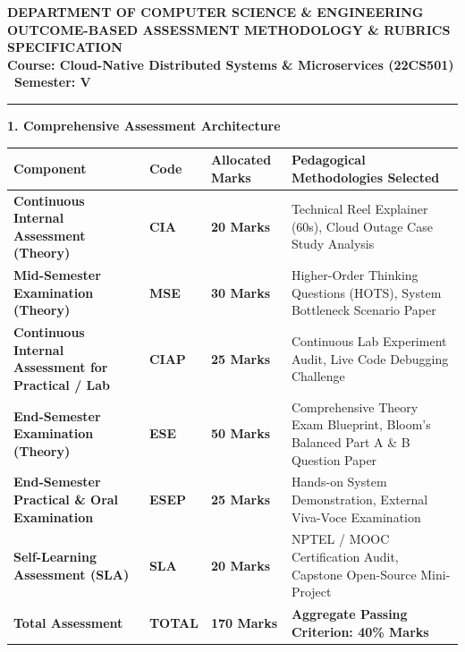 \documentclass[10pt,a4paper]{article}
\begin{document}
\begin{center}
    {\large\textbf{\color{nbaNavy}DEPARTMENT OF COMPUTER SCIENCE \& ENGINEERING}}\\[2pt]
    {\normalsize\textbf{\color{nbaSlate}OUTCOME-BASED ASSESSMENT METHODOLOGY \& RUBRICS SPECIFICATION}}\\[2pt]
    {\footnotesize\textbf{Course: Cloud-Native Distributed Systems \& Microservices (22CS501) \textbullet\ Semester: V}}\\[4pt]
    \rule{\linewidth}{1.2pt}
\end{center}

\vspace{-4pt}

{\large\textbf{\color{nbaNavy}1. Comprehensive Assessment Architecture}}

\begin{table}[h!]
\centering
\small
{}
\begin{tabularx}{\textwidth}{L{2.5cm} C{1.8cm} C{2.2cm} Y}
\toprule
\textbf{Component} & \textbf{Code} & \textbf{Allocated Marks} & \textbf{Pedagogical Methodologies Selected} \\
\midrule
\textbf{Continuous Internal Assessment (Theory)} & \textbf{CIA} & \textbf{20 Marks} & Technical Reel Explainer (60s), Cloud Outage Case Study Analysis \\
\textbf{Mid-Semester Examination (Theory)} & \textbf{MSE} & \textbf{30 Marks} & Higher-Order Thinking Questions (HOTS), System Bottleneck Scenario Paper \\
\textbf{Continuous Internal Assessment for Practical / Lab} & \textbf{CIAP} & \textbf{25 Marks} & Continuous Lab Experiment Audit, Live Code Debugging Challenge \\
\textbf{End-Semester Examination (Theory)} & \textbf{ESE} & \textbf{50 Marks} & Comprehensive Theory Exam Blueprint, Bloom's Balanced Part A \& B Question Paper \\
\textbf{End-Semester Practical \& Oral Examination} & \textbf{ESEP} & \textbf{25 Marks} & Hands-on System Demonstration, External Viva-Voce Examination \\
\textbf{Self-Learning Assessment (SLA)} & \textbf{SLA} & \textbf{20 Marks} & NPTEL / MOOC Certification Audit, Capstone Open-Source Mini-Project \\
\midrule
{}
\textbf{Total Assessment} & \textbf{TOTAL} & \textbf{170 Marks} & \textbf{Aggregate Passing Criterion: 40\% Marks} \\
\bottomrule
\end{tabularx}
\end{table}
\end{document}

